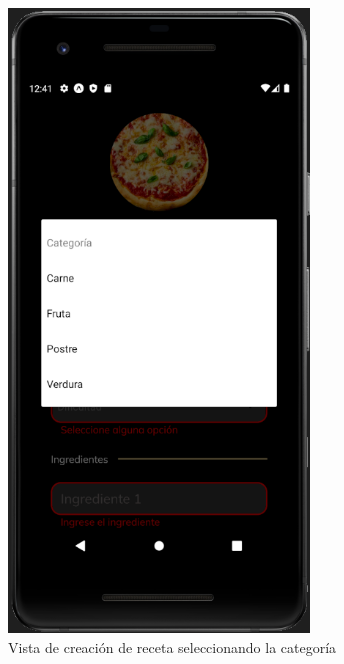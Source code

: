\begin{figure}[!h]
  \centering
  \includegraphics[width=8cm, scale=1]{Images/Imagenes/add5.png}
  \caption{Vista de creación de receta seleccionando la categoría}
  \label{fig:add5}
\end{figure}

